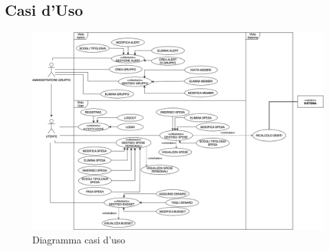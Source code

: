 \subsection{Casi d'Uso}

    \begin{figure}[h]
        \centering
        \includegraphics[width=1.1\textwidth, trim=3cm 0cm 1cm 0cm]{images/DiagrammaCasiDusoV1.4.png}
        \caption{Diagramma casi d'uso }
    \end{figure}

